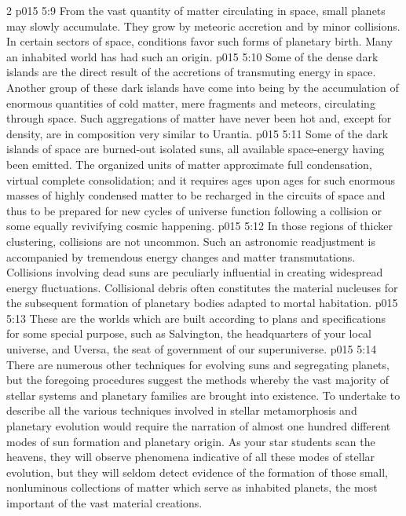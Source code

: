 \begin{multicols}{2}
\pc \vs p015 5:9 \bibnobreakspace {} From the vast quantity of matter circulating in space, small planets may slowly accumulate. They grow by meteoric accretion and by minor collisions. In certain sectors of space, conditions favor such forms of planetary birth. Many an inhabited world has had such an origin.
\vs p015 5:10 Some of the dense dark islands are the direct result of the accretions of transmuting energy in space. Another group of these dark islands have come into being by the accumulation of enormous quantities of cold matter, mere fragments and meteors, circulating through space. Such aggregations of matter have never been hot and, except for density, are in composition very similar to Urantia.
\pc \vs p015 5:11 \bibnobreakspace {} Some of the dark islands of space are burned\hyp{}out isolated suns, all available space\hyp{}energy having been emitted. The organized units of matter approximate full condensation, virtual complete consolidation; and it requires ages upon ages for such enormous masses of highly condensed matter to be recharged in the circuits of space and thus to be prepared for new cycles of universe function following a collision or some equally revivifying cosmic happening.
\pc \vs p015 5:12 \bibnobreakspace {} In those regions of thicker clustering, collisions are not uncommon. Such an astronomic readjustment is accompanied by tremendous energy changes and matter transmutations. Collisions involving dead suns are peculiarly influential in creating widespread energy fluctuations. Collisional debris often constitutes the material nucleuses for the subsequent formation of planetary bodies adapted to mortal habitation.
\pc \vs p015 5:13 \bibnobreakspace {} These are the worlds which are built according to plans and specifications for some special purpose, such as Salvington, the headquarters of your local universe, and Uversa, the seat of government of our superuniverse.
\pc \vs p015 5:14 There are numerous other techniques for evolving suns and segregating planets, but the foregoing procedures suggest the methods whereby the vast majority of stellar systems and planetary families are brought into existence. To undertake to describe all the various techniques involved in stellar metamorphosis and planetary evolution would require the narration of almost one hundred different modes of sun formation and planetary origin. As your star students scan the heavens, they will observe phenomena indicative of all these modes of stellar evolution, but they will seldom detect evidence of the formation of those small, nonluminous collections of matter which serve as inhabited planets, the most important of the vast material creations.

\end{multicols}
